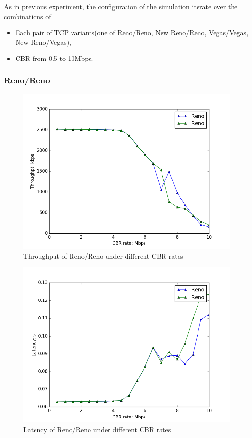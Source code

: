 \documentclass[10pt, conference]{IEEEtran/IEEEtran}
\begin{document}
As in previous experiment, the configuration of the simulation iterate over the combinations of 
\begin{itemize}
\item Each pair of TCP variants(one of Reno/Reno, New Reno/Reno, Vegas/Vegas,
New Reno/Vegas), 
\item CBR from 0.5 to 10Mbps.
\end{itemize}

\subsubsection{Reno/Reno}
\begin{figure}[!ht]
\begin{center}
\includegraphics[width=\linewidth]{../exp2/exp2_Reno_Reno_thpt.png}
\caption{Throughput of Reno/Reno under different CBR rates}
\label{exp2_Reno_Reno_thpt}
\end{center}
\end{figure}

\begin{figure}[!ht]
\begin{center}
\includegraphics[width=\linewidth]{../exp2/exp2_Reno_Reno_lat.png}
\caption{Latency of Reno/Reno under different CBR rates}
\label{exp2_Reno_Reno_lat}
\end{center}
\end{figure}
\end{document}
